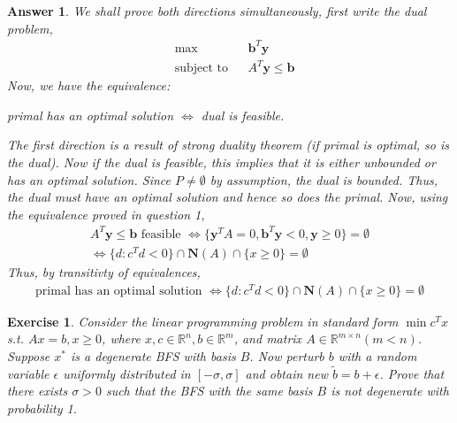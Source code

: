 \documentclass[12pt]{article}
\theoremstyle{colon}
\newtheorem{exercise}{Exercise}
\newtheorem*{answer}{Answer}
\begin{document}
\begin{answer}
  We shall prove both directions simultaneously, first write the dual problem,
  \begin{align*}
    &\max &&\textbf{b}^T \textbf{y} \\
    &\text{subject to} &&A^T\textbf{y} \leq \textbf{b}
  \end{align*}
  Now, we have the equivalence:
  \begin{center}
    primal has an optimal solution $\Longleftrightarrow$ dual is feasible.
  \end{center}
  The first direction is a result of strong duality theorem (if primal is optimal, so is the dual). Now if the dual is feasible, this implies that it is either unbounded or has an optimal solution. Since $P \neq \emptyset$ by assumption, the dual is bounded. Thus, the dual must have an optimal solution and hence so does the primal. Now, using the equivalence proved in question 1,
  \begin{gather*}
    A^T\textbf{y} \leq \textbf{b} \text{ feasible } \Longleftrightarrow \{ \textbf{y}^T A = 0, \textbf{b}^T \textbf{y} < 0, \textbf{y} \geq 0 \} = \emptyset \\
    \Longleftrightarrow \{ d: c^T d < 0  \} \cap \textbf{N}(A) \cap \{ x \geq 0 \} = \emptyset
  \end{gather*}
  Thus, by transitivty of equivalences,
  \begin{gather*}
    \text{primal has an optimal solution } \Longleftrightarrow \{ d: c^T d < 0  \} \cap \textbf{N}(A) \cap \{ x \geq 0 \} = \emptyset
  \end{gather*}
\end{answer}

\clearpage

\begin{exercise}
  Consider the linear programming problem in standard form $\min c^T x$ s.t. $Ax =b, x \geq 0$, where $x, c \in \mathbb{R}^n, b \in \mathbb{R}^m$, and matrix $A \in \mathbb{R}^{m \times n} (m < n)$. Suppose $x^*$ is a degenerate BFS with basis $B$. Now perturb $b$ with a random variable $\epsilon$ uniformly distributed in $[-\sigma, \sigma]$ and obtain new $\tilde{b} = b + \epsilon$. Prove that there exists $\sigma > 0$ such that the BFS with the same basis $B$ is not degenerate with probability 1.
\end{exercise}
\end{document}
